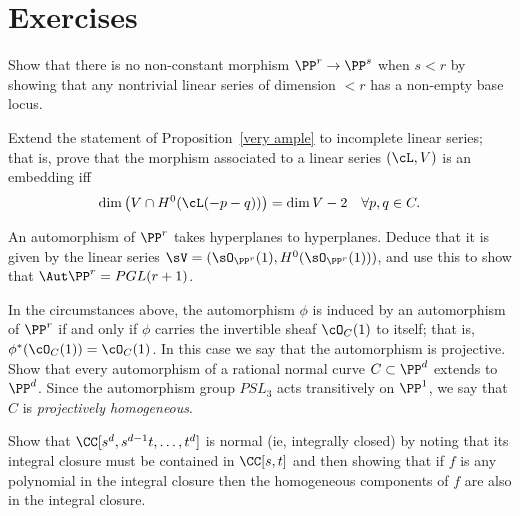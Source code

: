 \section{Exercises}

\begin{exercise}\label{here there be basepoints}
 Show that there is no non-constant morphism $\PP^r\to \PP^s$ when $s<r$ by showing that any nontrivial linear
 series of dimension $<r$ has a non-empty base locus.
\end{exercise}

\begin{exercise}
Extend the statement of Proposition~\ref{very ample} to incomplete linear series; that is, prove that the morphism associated to a linear series $(\cL, V)$ is an embedding iff
$$
\dim\big( V \cap H^0(\cL(-p-q))\big) = \dim V - 2 \quad \forall p, q \in C.
$$
\end{exercise}

\begin{exercise}
An automorphism of $\PP^r$ takes hyperplanes to hyperplanes. Deduce that it is given by the linear series
$\sV = (\sO_{\PP^r}(1), H^0(\sO_{\PP^r}(1)))$, and use this to show that $\Aut \PP^r = PGL(r+1)$. 
\end{exercise}

\begin{exercise}\label{projective automorphism}
In the circumstances above, the automorphism $\phi$ is induced by an automorphism of $\PP^r$ if and only if $\phi$ carries the invertible sheaf $\cO_{C}(1)$ to itself; that is, $\phi^*(\cO_{C}(1)) = \cO_{C}(1)$. In this case we say that the automorphism
is projective. Show that every automorphism of a rational normal curve $C \subset \PP^d$  extends to $\PP^d$. Since the
automorphism group $PSL_3$ acts transitively on $\PP^1$, we say that
$C$ is \emph{projectively homogeneous}.


\end{exercise}

\begin{exercise}\label{normality of RNC}
 Show that $\CC[s^d,s^{d-1}t,\dots, t^d]$ is normal (ie, integrally closed) by noting that its integral closure must be
 contained in $\CC[s,t]$ and then showing that if $f$ is any polynomial
 in the integral closure then the homogeneous components of $f$ are also in the integral closure.
\end{exercise}



